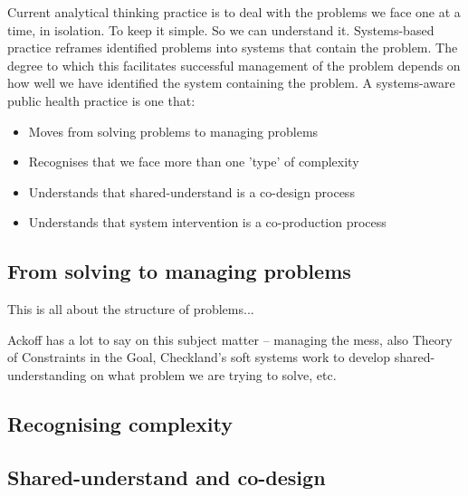 

Current analytical thinking practice is to deal with the problems we face one at a time, in isolation. To keep it simple. So we can understand it. Systems-based practice reframes identified problems into systems that contain the problem. The degree to which this facilitates successful management of the problem depends on how well we have identified the system containing the problem. A systems-aware public health practice is one that:
\begin{itemize}
	\item Moves from solving problems to managing problems
	\item Recognises that we face more than one 'type' of complexity
	\item Understands that shared-understand is a co-design process
	\item Understands that system intervention is a co-production process
\end{itemize}

\subsection{From solving to managing problems}
This is all about the structure of problems...

Ackoff has a lot to say on this subject matter -- managing the mess, also Theory of Constraints in the Goal, Checkland's soft systems work to develop shared-understanding on what problem we are trying to solve, etc.

\subsection*{Recognising complexity}

\subsection*{Shared-understand and co-design}

